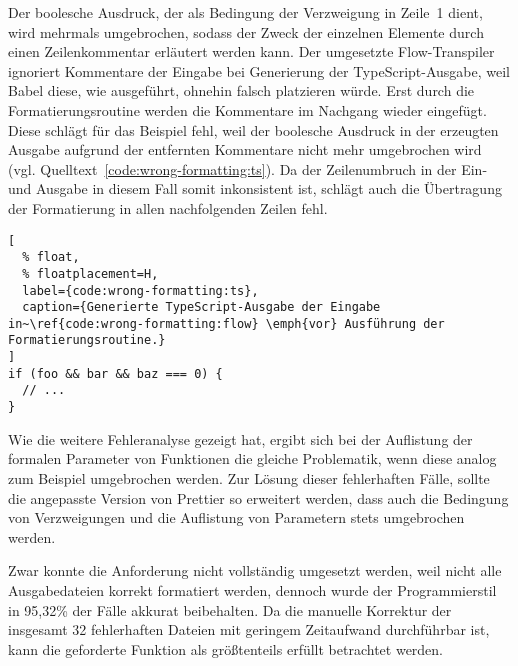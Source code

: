 Der boolesche Ausdruck, der als Bedingung der Verzweigung in Zeile~1 dient, wird mehrmals umgebrochen, sodass der Zweck der einzelnen Elemente durch einen Zeilenkommentar erläutert werden kann. Der umgesetzte Flow-Transpiler ignoriert Kommentare der Eingabe bei Generierung der TypeScript-Ausgabe, weil Babel diese, wie ausgeführt, ohnehin falsch platzieren würde. Erst durch die Formatierungsroutine werden die Kommentare im Nachgang wieder eingefügt. Diese schlägt für das Beispiel fehl, weil der boolesche Ausdruck in der erzeugten Ausgabe aufgrund der entfernten Kommentare nicht mehr umgebrochen wird (vgl. Quelltext~\ref{code:wrong-formatting:ts}). Da der Zeilenumbruch in der Ein- und Ausgabe in diesem Fall somit inkonsistent ist, schlägt auch die Übertragung der Formatierung in allen nachfolgenden Zeilen fehl.

\begin{lstlisting}[
  % float,
  % floatplacement=H,
  label={code:wrong-formatting:ts},
  caption={Generierte TypeScript-Ausgabe der Eingabe in~\ref{code:wrong-formatting:flow} \emph{vor} Ausführung der Formatierungsroutine.}
]
if (foo && bar && baz === 0) {
  // ...
}
\end{lstlisting}

Wie die weitere Fehleranalyse gezeigt hat, ergibt sich bei der Auflistung der formalen Parameter von Funktionen die gleiche Problematik, wenn diese analog zum Beispiel umgebrochen werden. Zur Lösung dieser fehlerhaften Fälle, sollte die angepasste Version von Prettier so erweitert werden, dass auch die Bedingung von Verzweigungen und die Auflistung von Parametern stets umgebrochen werden.

Zwar konnte die Anforderung nicht vollständig umgesetzt werden, weil nicht alle Ausgabedateien korrekt formatiert werden, dennoch wurde der Programmierstil in 95,32\% der Fälle akkurat beibehalten. Da die manuelle Korrektur der insgesamt 32 fehlerhaften Dateien mit geringem Zeitaufwand durchführbar ist, kann die geforderte Funktion als größtenteils erfüllt betrachtet werden.
